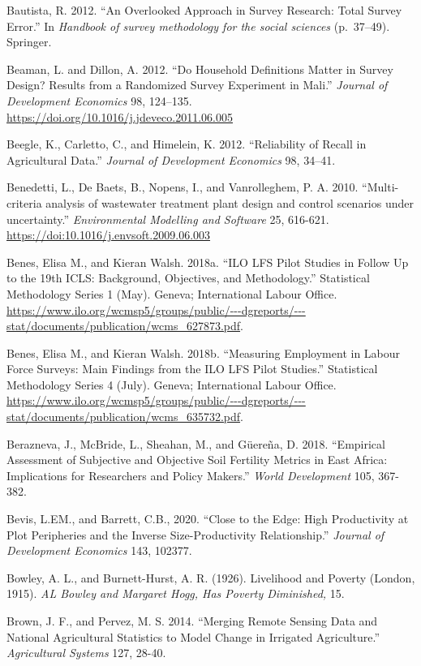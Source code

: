 \documentclass[
]{book}
\begin{document}
Bautista, R. 2012. ``An Overlooked Approach in Survey Research: Total Survey Error.'' In \emph{Handbook of survey methodology for the social sciences} (p.~37--49). Springer.

Beaman, L. and Dillon, A. 2012. ``Do Household Definitions Matter in Survey Design? Results from a Randomized Survey Experiment in Mali.'' \emph{Journal of Development Economics} 98, 124--135. \url{https://doi.org/10.1016/j.jdeveco.2011.06.005}

Beegle, K., Carletto, C., and Himelein, K. 2012. ``Reliability of Recall in Agricultural Data.'' \emph{Journal of Development Economics} 98, 34--41.

Benedetti, L., De Baets, B., Nopens, I., and Vanrolleghem, P. A. 2010. ``Multi-criteria analysis of wastewater treatment plant design and control scenarios under uncertainty.'' \emph{Environmental Modelling and Software} 25, 616-621. \url{https://doi:10.1016/j.envsoft.2009.06.003}

Benes, Elisa M., and Kieran Walsh. 2018a. ``ILO LFS Pilot Studies in Follow Up to the 19th ICLS: Background, Objectives, and Methodology.'' Statistical Methodology Series 1 (May). Geneva; International Labour Office. \url{https://www.ilo.org/wcmsp5/groups/public/---dgreports/---stat/documents/publication/wcms_627873.pdf}.

Benes, Elisa M., and Kieran Walsh. 2018b. ``Measuring Employment in Labour Force Surveys: Main Findings from the ILO LFS Pilot Studies.'' Statistical Methodology Series 4 (July). Geneva; International Labour Office. \url{https://www.ilo.org/wcmsp5/groups/public/---dgreports/---stat/documents/publication/wcms_635732.pdf}.

Berazneva, J., McBride, L., Sheahan, M., and Güereña, D. 2018. ``Empirical Assessment of Subjective and Objective Soil Fertility Metrics in East Africa: Implications for Researchers and Policy Makers.'' \emph{World Development} 105, 367-382.

Bevis, L.EM., and Barrett, C.B., 2020. ``Close to the Edge: High Productivity at Plot Peripheries and the Inverse Size-Productivity Relationship.'' \emph{Journal of Development Economics} 143, 102377.

Bowley, A. L., and Burnett-Hurst, A. R. (1926). Livelihood and Poverty (London, 1915). \emph{AL Bowley and Margaret Hogg, Has Poverty Diminished,} 15.

Brown, J. F., and Pervez, M. S. 2014. ``Merging Remote Sensing Data and National Agricultural Statistics to Model Change in Irrigated Agriculture.'' \emph{Agricultural Systems} 127, 28-40.
\end{document}
